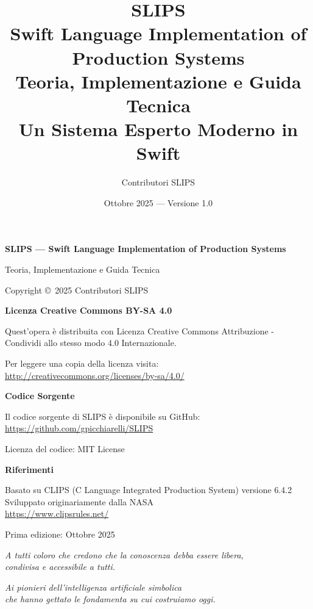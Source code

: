 \documentclass[12pt,a4paper,twoside,openright]{book}
\title{%
  {\Huge\textbf{SLIPS}}\\[0.5cm]
  {\Large Swift Language Implementation of Production Systems}\\[1cm]
  {\large Teoria, Implementazione e Guida Tecnica}\\[0.5cm]
  {\large Un Sistema Esperto Moderno in Swift}
}
\author{Contributori SLIPS}
\date{Ottobre 2025 --- Versione 1.0}
\theoremstyle{definition}
\theoremstyle{remark}
\begin{document}
\frontmatter
\maketitle

\cleardoublepage
\thispagestyle{empty}
\vspace*{\fill}
\begin{center}
\begin{minipage}{0.8\textwidth}
\small

\textbf{SLIPS --- Swift Language Implementation of Production Systems}

Teoria, Implementazione e Guida Tecnica

\bigskip

Copyright \copyright\ 2025 Contributori SLIPS

\bigskip

\textbf{Licenza Creative Commons BY-SA 4.0}

Quest'opera è distribuita con Licenza Creative Commons Attribuzione - Condividi allo stesso modo 4.0 Internazionale.

Per leggere una copia della licenza visita:\\
\url{http://creativecommons.org/licenses/by-sa/4.0/}

\bigskip

\textbf{Codice Sorgente}

Il codice sorgente di SLIPS è disponibile su GitHub:\\
\url{https://github.com/gpicchiarelli/SLIPS}

Licenza del codice: MIT License

\bigskip

\textbf{Riferimenti}

Basato su CLIPS (C Language Integrated Production System) versione 6.4.2\\
Sviluppato originariamente dalla NASA\\
\url{https://www.clipsrules.net/}

\bigskip

Prima edizione: Ottobre 2025

\end{minipage}
\end{center}
\vspace*{\fill}

\cleardoublepage
\thispagestyle{empty}
\vspace*{\fill}
\begin{center}
\textit{A tutti coloro che credono che la conoscenza debba essere libera,\\
condivisa e accessibile a tutti.}

\bigskip

\textit{Ai pionieri dell'intelligenza artificiale simbolica\\
che hanno gettato le fondamenta su cui costruiamo oggi.}
\end{center}
\vspace*{\fill}
\end{document}
